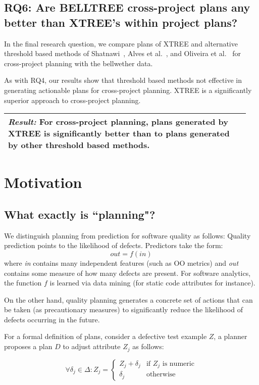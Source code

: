 \documentclass[10pt,journal,compsoc]{IEEEtran}
\newcommand{\result}[1]{
\vspace{0.2cm}
\noindent\begin{minipage}{\linewidth}
    \begin{tabular}{|p{0.95\linewidth}|}
    	\arrayrulecolor{Gray}
    	\hline\vspace{-0.2cm}
    	\rowcolor{Gray} \textit{\textbf{Result:}} #1\\\hline
    \end{tabular}
\end{minipage}\bigstrut%
}
\begin{document}
    
\subsection*{RQ6: Are  BELLTREE  cross-project  plans  any  better  than XTREE’s within project plans?}
    
In the final research question, we compare plans of XTREE and alternative threshold based methods of Shatnawi~\cite{shatnawi}, Alves et al.~\cite{alves}, and Oliveira et al.~\cite{oliveira} for cross-project planning with the bellwether data.

As with RQ4, our results show that threshold based methods not effective in generating actionable plans for cross-project planning. XTREE is a significantly superior approach to cross-project planning.

\result{For cross-project planning, plans generated by XTREE is significantly better than to plans generated by other threshold based methods.}


\section{Motivation}
\label{sect:motivate}



\subsection{What exactly is ``planning"?}

We distinguish planning from prediction for software quality as follows: 
Quality prediction points to the likelihood of defects. Predictors take the form:
\begin{equation*}
    out = f(in)    
\end{equation*}
where {\em in} contains many independent features (such as OO metrics) and {\em out} contains some measure of
how many defects are present. For software analytics, the function $f$ is learned via data mining (for static code attributes for instance).

On the other hand, quality planning generates a concrete set of actions that can be taken (as precautionary measures) to significantly reduce the likelihood of defects occurring in the future.

For a formal definition of plans, consider a defective test example $Z$, a planner
proposes a plan $D$ to adjust attribute $Z_j$ as follows:

{\small\[
\forall \delta_j \in \Delta :  Z_j =  
\begin{cases}
     Z_j + \delta_j& \text{if $Z_j$ is numeric}\\
    \delta_j              & \text{otherwise}
\end{cases}
\]}
\end{document}
